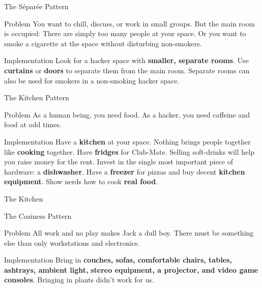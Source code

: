 \documentclass[mathserif]{beamer}
\begin{document}
\begin{frame}{The Séparée Pattern}
	\begin{alertblock}{Problem}
		You want to chill, discuss, or work in small groups.  But the main room is
		occupied: There are simply too many people at your space.  Or you want to
		smoke a cigarette at the space without disturbing non-smokers.
	\end{alertblock}
	\pause
	\begin{exampleblock}{Implementation}
		Look for a hacker space with \textbf{smaller, separate rooms}.  Use
		\textbf{curtains} or \textbf{doors} to separate them from the main room.
		Separate rooms can also be used for smokers in a non-smoking hacker space.
	\end{exampleblock}
	\begin{center}
	\end{center}
\end{frame}

\begin{frame}{The Kitchen Pattern}
	\begin{alertblock}{Problem}
		As a human being, you need food.  As a hacker, you need caffeine and food at
		odd times.
	\end{alertblock}
	\pause
	\begin{exampleblock}{Implementation}
		Have a \textbf{kitchen} at your space.  Nothing brings people together like
		\textbf{cooking} together.  Have \textbf{fridges} for Club-Mate.  Selling
		soft-drinks will help you raise money for the rent.  Invest in the single
		most important piece of hardware: a \textbf{dishwasher}.  Have a
		\textbf{freezer} for pizzas and buy decent \textbf{kitchen equipment}.  Show
		nerds how to cook \textbf{real food}.
	\end{exampleblock}
\end{frame}

\begin{frame}[plain]{The Kitchen}
	\begin{center}
	\end{center}
\end{frame}

\begin{frame}{The Coziness Pattern}
	\begin{alertblock}{Problem}
		All work and no play makes Jack a dull boy.  There must be something else
		than only workstations and electronics.
	\end{alertblock}
	\pause
	\begin{exampleblock}{Implementation}
		Bring in \textbf{couches, sofas, comfortable chairs, tables, ashtrays,
		ambient light,} \textbf{stereo equipment, a projector, and video game consoles}.
		Bringing in plants didn't work for us.
	\end{exampleblock}
\end{frame}
\end{document}
